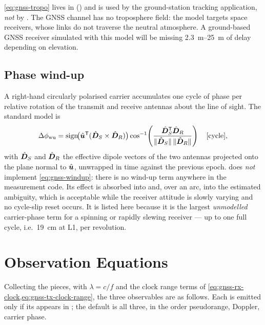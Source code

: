 \begin{lupntwarning}
  \cref{eq:gnss-tropo} lives in
  () and is used by the ground-station
  tracking application, \emph{not} by . The GNSS channel
  has no troposphere field: the model targets space receivers, whose links do
  not traverse the neutral atmosphere. A ground-based GNSS receiver simulated
  with this model will be missing \SIrange{2.3}{25}{\meter} of delay
  depending on elevation.
\end{lupntwarning}

\subsection{Phase wind-up}
\label{sec:gnss-windup}

A right-hand circularly polarised carrier accumulates one cycle of phase per
relative rotation of the transmit and receive antennas about the line of
sight. The standard model is
\begin{equation}
  \label{eq:gnss-windup}
  \Delta\phi_{\mathrm{wu}}
  = \operatorname{sign}\!\bigl(\hat{\bm{u}}^{\mathsf{T}}(\hat{\bm{D}}_S\times\hat{\bm{D}}_R)\bigr)
    \cos^{-1}\!\left(
      \frac{\hat{\bm{D}}_S^{\mathsf{T}}\hat{\bm{D}}_R}
           {\lVert \hat{\bm{D}}_S\rVert\,\lVert \hat{\bm{D}}_R\rVert}
    \right)
  \quad\text{[cycle]},
\end{equation}
with $\hat{\bm{D}}_S$ and $\hat{\bm{D}}_R$ the effective dipole vectors of the two
antennas projected onto the plane normal to $\hat{\bm{u}}$, unwrapped in time
against the previous epoch. \lupnt{} does \emph{not} implement
\cref{eq:gnss-windup}: there is no wind-up term anywhere in the measurement
code. Its effect is absorbed into  and, over an arc,
into the estimated ambiguity, which is acceptable while the receiver attitude
is slowly varying and no cycle-slip reset occurs. It is listed here because it
is the largest \emph{unmodelled} carrier-phase term for a spinning or
rapidly slewing receiver --- up to one full cycle, i.e.\ \SI{19}{\centi\meter}
at L1, per revolution.

\section{Observation Equations}
\label{sec:gnss-observables}

Collecting the pieces, with $\lambda = c/f$ and the clock range terms of
\cref{eq:gnss-rx-clock,eq:gnss-tx-clock-range}, the three observables are as
follows. Each is emitted only if its  appears in
; the default is all three, in the order
pseudorange, Doppler, carrier phase.

